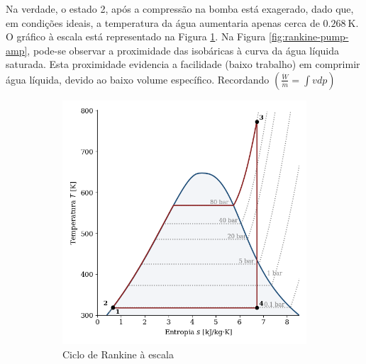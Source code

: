 Na verdade, o estado 2, após a compressão na bomba está exagerado, dado que, em condições ideais, a temperatura da água aumentaria apenas cerca de $0.268~\text{K}$. O gráfico à escala está representado na Figura \ref{fig:rankine-Ts-ideal-true-powerplant}. Na Figura \ref{fig:rankine-pump-amp}, pode-se observar a proximidade das isobáricas à curva da água líquida saturada. Esta proximidade evidencia a facilidade (baixo trabalho) em comprimir água líquida, devido ao baixo volume específico. Recordando $(\frac{\dot{W}}{\dot{m}} = \int v dp)$

\begin{figure}[H]
    \centering
    \begin{subfigure}{0.45\textwidth}
        \centering
        \includegraphics[width=\textwidth]{graphs/rankine-Ts-ideal-true-powerplant.png}
        \caption{Ciclo de Rankine à escala}
        \label{fig:rankine-Ts-ideal-true-powerplant}
    \end{subfigure}
    \hfill
    \begin{subfigure}{0.4\textwidth}
        \centering

\end{subfigure}
\end{figure}
